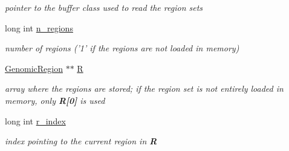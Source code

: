 \begin{CompactItemize}
\begin{CompactList}\small\item\em pointer to the buffer class used to read the region sets \item\end{CompactList}\item 
\hypertarget{classGenomicRegionSet_5293292428aa06145b38be4b96ab05e4}{
long int \hyperlink{classGenomicRegionSet_5293292428aa06145b38be4b96ab05e4}{n\_\-regions}}
\label{classGenomicRegionSet_5293292428aa06145b38be4b96ab05e4}

\begin{CompactList}\small\item\em number of regions ('1' if the regions are not loaded in memory) \item\end{CompactList}\item 
\hypertarget{classGenomicRegionSet_206d91b443832800afc04f786d15971d}{
\hyperlink{classGenomicRegion}{GenomicRegion} $\ast$$\ast$ \hyperlink{classGenomicRegionSet_206d91b443832800afc04f786d15971d}{R}}
\label{classGenomicRegionSet_206d91b443832800afc04f786d15971d}

\begin{CompactList}\small\item\em array where the regions are stored; if the region set is not entirely loaded in memory, only {\bf R\mbox{[}0\mbox{]}} is used \item\end{CompactList}\item 
\hypertarget{classGenomicRegionSet_d89185b88d5b37161cc65bc84b421c0e}{
long int \hyperlink{classGenomicRegionSet_d89185b88d5b37161cc65bc84b421c0e}{r\_\-index}}
\label{classGenomicRegionSet_d89185b88d5b37161cc65bc84b421c0e}

\begin{CompactList}\small\item\em index pointing to the current region in {\bf R} \item\end{CompactList}\end{CompactItemize}
